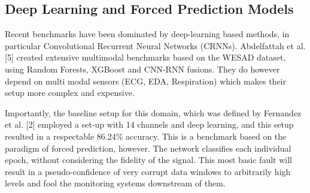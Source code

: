 \documentclass[conference,a4paper]{IEEEtran}
\begin{document}
\subsection{Deep Learning and Forced Prediction Models}
Recent benchmarks have been dominated by deep-learning based methods, in particular Convolutional Recurrent Neural Networks (CRNNs). Abdelfattah et al. [5] created extensive multimodal benchmarks based on the WESAD dataset, using Random Forests, XGBoost and CNN-RNN fusions. They do however depend on multi modal sensors (ECG, EDA, Respiration) which makes their setup more complex and expensive. 

Importantly, the baseline setup for this domain, which was defined by Fernandez et al. [2] employed a set-up with 14 channels and deep learning, and this setup resulted in a respectable 86.24\% accuracy. This is a benchmark based on the paradigm of forced prediction, however. The network classifies each individual epoch, without considering the fidelity of the signal. This most basic fault will result in a pseudo-confidence of very corrupt data windows to arbitrarily high levels and fool the monitoring systems downstream of them.
\end{document}
